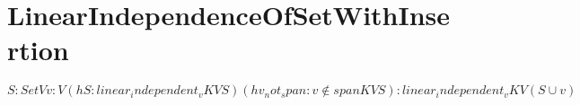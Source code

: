 \section{LinearIndependenceOfSetWithInsertion}

\begin{theorem}
  \label{theorem : linear_independent_insert_of_not_in_span}
  \leanok
  ${S : Set V} {v : V}
  (hS : linear_independent_v K V S)
  (hv_not_span : v \notin span K V S):
  linear_independent_v K V (S \cup {v})$
\end{theorem}
